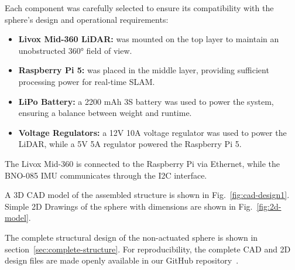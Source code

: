 \documentclass[english, bachelor, utf8]{base/thesis_telematics}
\begin{document}
Each component was carefully selected to ensure its compatibility with the sphere's design and operational requirements:
\begin{itemize}
    \item \textbf{Livox Mid-360 LiDAR:} was mounted on the top layer to maintain an unobstructed 360° field of view.
    \item \textbf{Raspberry Pi 5:} was placed in the middle layer, providing sufficient processing power for real-time SLAM.
    \item \textbf{LiPo Battery:} a 2200 mAh 3S battery was used to power the system, ensuring a balance between weight and runtime.
    \item \textbf{Voltage Regulators:} a 12V 10A voltage regulator was used to power the LiDAR, while a 5V 5A regulator powered the Raspberry Pi 5.
\end{itemize}
The Livox Mid-360 is connected to the Raspberry Pi via Ethernet, while the BNO-085 IMU communicates through the I2C interface. 

A 3D CAD model of the assembled structure is shown in Fig.~\ref{fig:cad-design1}.
Simple 2D Drawings of the sphere with dimensions are shown in Fig.~\ref{fig:2d-model}.

The complete structural design of the non-actuated sphere is shown in section~\ref{sec:complete-structure}.
For reproducibility, the complete CAD and 2D design files are made openly available in our GitHub repository~\cite{githubsphere}.
\clearpage
\end{document}
